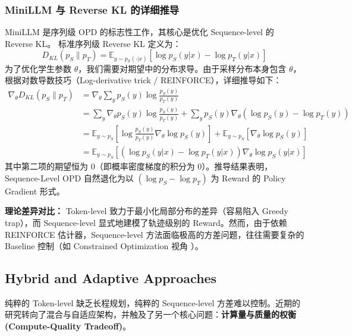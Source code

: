 \subsubsection{MiniLLM 与 Reverse KL 的详细推导 \cite{gu2023minillm}}
MiniLLM 是序列级 OPD 的标志性工作，其核心是优化 Sequence-level 的 Reverse KL。
标准序列级 Reverse KL 定义为：
\begin{equation}
    D_{KL}(p_S \parallel p_T) = \mathbb{E}_{y \sim p_S(\cdot|x)} \left[ \log p_S(y|x) - \log p_T(y|x) \right]
\end{equation}
为了优化学生参数 $\theta$，我们需要对期望中的分布求导。由于采样分布本身包含 $\theta$，根据对数导数技巧（Log-derivative trick / REINFORCE），详细推导如下：
\begin{align}
    \nabla_\theta D_{KL}(p_S \parallel p_T) &= \nabla_\theta \sum_y p_S(y) \log \frac{p_S(y)}{p_T(y)} \nonumber \\
    &= \sum_y \nabla_\theta p_S(y) \log \frac{p_S(y)}{p_T(y)} + \sum_y p_S(y) \nabla_\theta (\log p_S(y) - \log p_T(y)) \nonumber \\
    &= \mathbb{E}_{y \sim p_S} \left[ \log \frac{p_S(y)}{p_T(y)} \nabla_\theta \log p_S(y) \right] + \mathbb{E}_{y \sim p_S} \left[ \nabla_\theta \log p_S(y) \right] \nonumber \\
    &= \mathbb{E}_{y \sim p_S} \left[ \left(\log p_S(y|x) - \log p_T(y|x)\right) \nabla_\theta \log p_S(y|x) \right]
\end{align}
其中第二项的期望恒为 0（即概率密度梯度的积分为 0）。推导结果表明，Sequence-Level OPD 自然退化为以 $(\log p_S - \log p_T)$ 为 Reward 的 Policy Gradient 形式。

\textbf{理论差异对比：} Token-level 致力于最小化局部分布的差异（容易陷入 Greedy trap），而 Sequence-level 显式地建模了轨迹级别的 Reward。然而，由于依赖 REINFORCE 估计器，Sequence-level 方法面临极高的方差问题，往往需要复杂的 Baseline 控制（如 Constrained Optimization 视角 \cite{constrainedopd2025}）。

\subsection{Hybrid and Adaptive Approaches}
\label{subsec:hybrid}

纯粹的 Token-level 缺乏长程规划，纯粹的 Sequence-level 方差难以控制。近期的研究转向了混合与自适应架构，并触及了另一个核心问题：\textbf{计算量与质量的权衡 (Compute-Quality Tradeoff)}。

